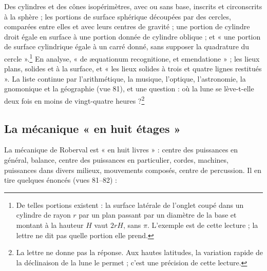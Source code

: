 \documentclass[11pt,a4paper]{article}
\begin{document}
Des cylindres et des cônes isopérimètres, avec ou sans base, inscrits et
circonscrits à la sphère ; les portions de surface sphérique découpées par des
cercles, comparées entre elles et avec leurs centres de gravité ; une portion de
cylindre droit égale en surface à une portion donnée de cylindre oblique ; et
« une portion de surface cylindrique égale à un carré donné, sans supposer la
quadrature du cercle ».\footnote{De telles portions existent : la surface latérale
de l'onglet coupé dans un cylindre de rayon $r$ par un plan passant par un
diamètre de la base et montant à la hauteur $H$ vaut $2rH$, sans $\pi$. L'exemple
est de cette lecture ; la lettre ne dit pas quelle portion elle prend.} En
analyse, « de æquationum recognitione, et emendatione » ; les lieux plans,
solides et à la surface, et « les lieux solides à trois et quatre lignes
restitués ». La liste continue par l'arithmétique, la musique, l'optique,
l'astronomie, la gnomonique et la géographie (vue 81), et une question : où la
lune se lève-t-elle deux fois en moins de vingt-quatre heures ?\footnote{La lettre
ne donne pas la réponse. Aux hautes latitudes, la variation rapide de la
déclinaison de la lune le permet ; c'est une précision de cette lecture.}

\subsection*{La mécanique « en huit étages »}

La mécanique de Roberval est « en huit livres » : centre des puissances en
général, balance, centre des puissances en particulier, cordes, machines,
puissances dans divers milieux, mouvements composés, centre de percussion. Il en
tire quelques énoncés (vues 81--82) :
\end{document}
